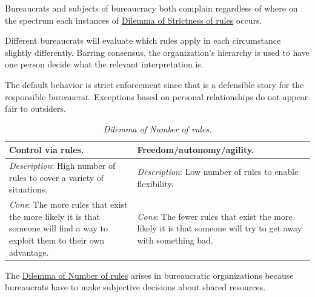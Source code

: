 Bureaucrats and subjects of bureaucracy both complain regardless of where on the spectrum each instances of \hyperref[table:rule-strictness]{Dilemma of Strictness of rules} occurs. 

Different bureaucrats will evaluate which rules apply in each circumstance slightly differently. Barring consensus, the organization's hierarchy is used to have one person decide what the relevant interpretation is.

The default behavior is strict enforcement since that is a defensible story for the responsible bureaucrat. Exceptions based on personal relationships do not appear fair to outsiders.


\begin{center}
\begin{table}[H] %
\begin{tabular}{ | m{\dilemmatablewidth}| m{\dilemmatablewidth} | } 
  \hline
  \textbf{Control via rules.} & \textbf{Freedom/autonomy/agility.} \\ 
  \hline
  \textit{Description}: High number of rules to cover a variety of situations. & 
  \textit{Description}: Low number of rules to enable flexibility. \\ 
  \hline
  \textit{Cons}: The more rules that exist the more likely it is that someone will find a way to exploit them to their own advantage. & 
  \textit{Cons}: The fewer rules that exist the more likely it is that someone will try to get away with something bad. \\  
  \hline
\end{tabular}
\caption{
\textit{Dilemma of Number of rules.}
}
\label{table:number-of-rules}
\end{table}
\end{center}



The \hyperref[table:number-of-rules]{Dilemma of Number of rules}
arises in bureaucratic organizations because bureaucrats have to make subjective decisions about shared resources. 

